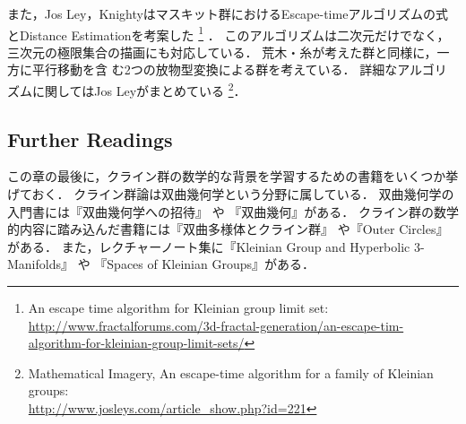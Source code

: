 また，Jos Ley，Knightyはマスキット群におけるEscape-timeアルゴリズムの式
とDistance Estimationを考案した
\footnote{An escape time algorithm for Kleinian group limit set:\\ \quad
\quad
\url{http://www.fractalforums.com/3d-fractal-generation/an-escape-tim-algorithm-for-kleinian-group-limit-sets/}}
．
このアルゴリズムは二次元だけでなく，三次元の極限集合の描画にも対応している．
荒木・糸\cite{araki2008extension}が考えた群と同様に，一方に平行移動を含
む2つの放物型変換による群を考えている．
詳細なアルゴリズムに関してはJos Leyがまとめている
\footnote{Mathematical Imagery, An escape-time algorithm for a family of
Kleinian groups:\\ \quad \quad \url{http://www.josleys.com/article_show.php?id=221}}．

\subsection{Further Readings}

この章の最後に，クライン群の数学的な背景を学習するための書籍をいくつか挙げておく．
クライン群論は双曲幾何学という分野に属している．
双曲幾何学の入門書には『双曲幾何学への招待』
\cite{taniguchi_okumura199610invitation}や
『双曲幾何』\cite{mitani200409hyperbolicGeometry}がある．
クライン群の数学的内容に踏み込んだ書籍には『双曲多様体とクライン群』
\cite{taniguchi_matsuzaki_hyperbolicManifold}や『Outer Circles』
\cite{Marden200705outerCircles}がある．
また，レクチャーノート集に『Kleinian Group and Hyperbolic 3-Manifolds』
\cite{Y._V._C.200311}や
『Spaces of Kleinian Groups』\cite{Yair_Makoto_Caroline200606}がある．

\clearpage